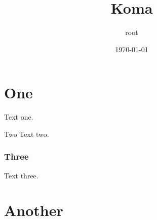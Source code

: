 \documentclass[a4paper,12pt]{scrartcl}
\author{root}
\date{\today}
\title{Koma}
\begin{document}
\maketitle
\tableofcontents


\section{One}
\label{sec:orgc8699ef}
Text one.
\begin{block}{Two}
\label{sec:org05ea48f}
Text two.
\subsubsection{Three}
\label{sec:orgac86c94}
Text three.
\end{block}
\section{Another}
\label{sec:org1718172}
\end{document}

